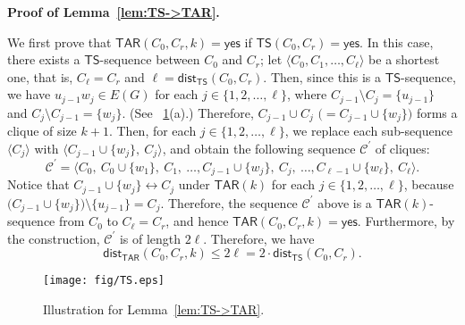 \documentclass{llncs}
\newcommand{\onestep}{\leftrightarrow}
\newcommand{\TAR}[1]{\mathsf{TAR}(#1)}
\newcommand{\TS}{\mathsf{TS}}
\newcommand{\ini}{0}
\newcommand{\tar}{r}
\newcommand{\cliq}{C}
\newcommand{\YES}{\mathsf{yes}}
\newcommand{\TARins}[3]{\mathsf{TAR}(#1,#2,#3)}
\newcommand{\TSins}[2]{\mathsf{TS}(#1,#2)}
\newcommand{\distTAR}[3]{\mathsf{dist_{TAR}}(#1,#2,#3)}
\newcommand{\distTS}[2]{\mathsf{dist_{TS}}(#1,#2)}
\newcounter{one}
\begin{document}
	\noindent
	{\bf Proof of Lemma~\ref{lem:TS->TAR}.}

We first prove that $\TARins{\cliq_{\ini}}{\cliq_{\tar}}{k} = \YES$ if $\TSins{\cliq_{\ini}}{\cliq_{\tar}} = \YES$.
	In this case, there exists a $\TS$-sequence between $\cliq_{\ini}$ and $\cliq_{\tar}$; 
let $\langle \cliq_{0}, \cliq_{1}, \dots, \cliq_{\ell} \rangle$ be a shortest one, that is, $\cliq_{\ell} = \cliq_{\tar}$ and $\ell = \distTS{\cliq_{\ini}}{\cliq_{\tar}}$.
	Then, since this is a $\TS$-sequence, we have $u_{j-1} w_j \in E(G)$ for each $j \in \{1,2, \ldots, \ell\}$, where $\cliq_{j-1} \setminus \cliq_{j} = \{ u_{j-1} \}$ and $\cliq_{j} \setminus \cliq_{j-1} = \{ w_j\}$. 
(See \figurename~\ref{fig:TS}(a).)
	Therefore, $\cliq_{j-1} \cup \cliq_j$ $\bigl(= \cliq_{j-1} \cup \{ w_j \} \bigr)$ forms a clique of size $k+1$.
	Then, for each $j \in \{1,2, \ldots, \ell\}$, we replace each sub-sequence $\langle \cliq_j \rangle$ with $\langle \cliq_{j-1} \cup \{ w_{j} \},\ \cliq_j \rangle$, and obtain the following sequence $\mathcal{C}^\prime$ of cliques:
	\[
		\mathcal{C}^\prime = \langle \cliq_0,\ \cliq_0 \cup \{w_1 \},\ \cliq_1,\ \ldots, \cliq_{j-1} \cup \{ w_{j} \},\ \cliq_{j},\ \ldots,\cliq_{\ell-1} \cup \{ w_{\ell} \},\  \cliq_{\ell} \rangle.   
	\]
	Notice that $\cliq_{j-1} \cup \{ w_{j} \} \onestep \cliq_{j}$ under $\TAR{k}$ for each $j \in \{1,2, \ldots, \ell\}$, because $\bigl( \cliq_{j-1} \cup \{ w_{j} \} \bigr) \setminus \{ u_{j-1} \} = \cliq_j$.
	Therefore, the sequence $\mathcal{C}^\prime$ above is a $\TAR{k}$-sequence from $\cliq_0$ to $\cliq_{\ell} = \cliq_{\tar}$, and hence $\TARins{\cliq_{\ini}}{\cliq_{\tar}}{k} = \YES$. 
	Furthermore, by the construction, $\mathcal{C}^\prime$ is of length $2\ell$.
	Therefore, we have 
	\begin{equation} \label{eq:TAR<=2TS}
		\distTAR{\cliq_{\ini}}{\cliq_{\tar}}{k} \le 2 \ell = 2 \cdot \distTS{\cliq_{\ini}}{\cliq_{\tar}}.
	\end{equation}

	\begin{figure}[t]
		\centering
		\texttt{[image: fig/TS.eps]}
	\vspace{-1em}
	\caption{Illustration for Lemma~\ref{lem:TS->TAR}.}
	\vspace{-1em}
	\label{fig:TS}
	\end{figure}
\end{document}
